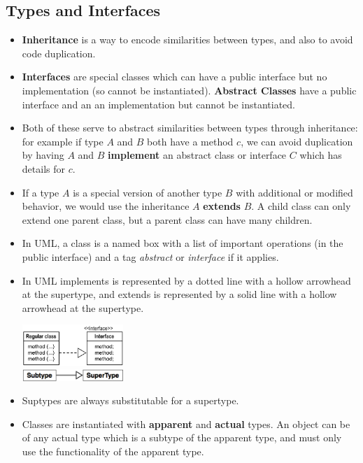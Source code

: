 \documentclass[letterpaper] {article}
\begin{document}
    \subsection{Types and Interfaces}
    \begin{itemize}
        \item \textbf{Inheritance} is a way to encode similarities between types, and also to avoid code duplication. 
        \item \textbf{Interfaces} are special classes which can have a public interface but no implementation (so cannot be instantiated). \textbf{Abstract Classes} have a public interface and an an implementation but cannot be instantiated. 
        \item Both of these serve to abstract similarities between types through inheritance: for example if type $A$ and $B$ both have a method $c$, we can avoid duplication by having $A$ and $B$ \textbf{implement} an abstract class or interface $C$ which has details for $c$. 
        \item If a type $A$ is a special version of another type $B$ with additional or modified behavior, we would use the inheritance $A$ \textbf{extends} $B$. A child class can only extend one parent class, but a parent class can have many children. 
        \item In UML, a class is a named box with a list of important operations (in the public interface) and a tag \textit{abstract} or \textit{interface} if it applies. 
        \item In UML implements is represented by a dotted line with a hollow arrowhead at the supertype, and extends is represented by a solid line with a hollow arrowhead at the supertype. 
            \begin{center}
                \includegraphics[width=1.5in]{implements} \\
                \medskip
                \includegraphics[width=1.5in]{extends}
        \end{center}
        \item Suptypes are always substitutable for a supertype. 
        \item Classes are instantiated with \textbf{apparent} and \textbf{actual} types. An object can be of any actual type which is a subtype of the apparent type, and must only use the functionality of the apparent type.  

\end{itemize}
\end{document}
